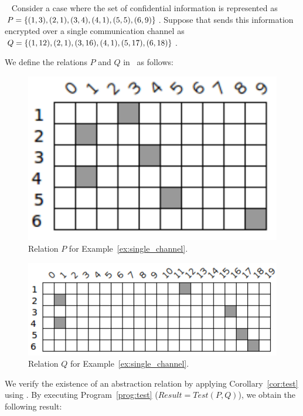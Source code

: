 \begin{example}~
\label{ex:single_channel}
	Consider a case where the set of confidential information is represented as $P = \{(1,3),(2,1),(3,4),(4,1),(5,5),(6,9)\}$. Suppose that \AgentOne sends this information encrypted over a single communication channel as $Q = \{(1,12),(2,1),\\(3,16),(4,1),(5,17),(6,18)\}$. \newline 
	
	We define the relations $P$ and $Q$ in \relview\ as follows: \newline
	
	\begin{figure}[ht]
		\centering
		\includegraphics[scale=0.65]{Figures/PDF/Relview/P.pdf}
		\caption{Relation $P$ for Example~\ref{ex:single_channel}.}
		\label{fig:single_channel_p}
	\end{figure}
	
	\begin{figure}[ht]
		\centering
		\includegraphics[scale=0.65]{Figures/PDF/Relview/Q.pdf}
		\caption{Relation $Q$ for Example~\ref{ex:single_channel}.}
		\label{fig:single_channel_q}
	\end{figure}	
	
	We verify the existence of an abstraction relation by applying Corollary~\ref{cor:test} using \relview. By executing Program~\ref{prog:test} ($Result = Test(P,Q)$), we obtain the following result: \newline
	

\end{example}
